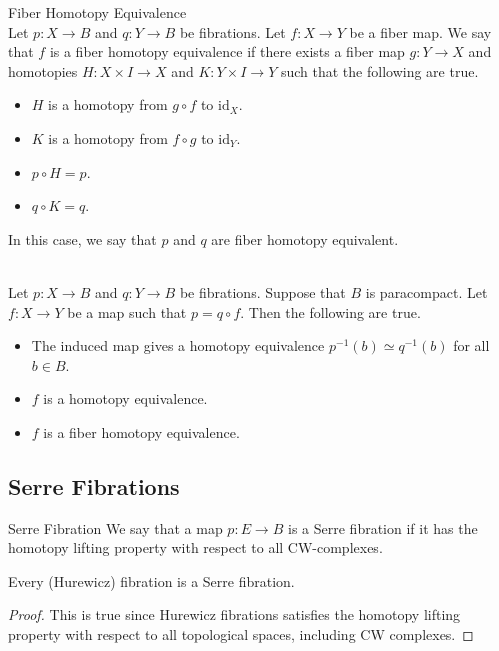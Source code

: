 \documentclass[a4paper]{article}
\begin{document}
\begin{defn}{Fiber Homotopy Equivalence}{}\\
Let $p:X\to B$ and $q:Y\to B$ be fibrations. Let $f:X\to Y$ be a fiber map. We say that $f$ is a fiber homotopy equivalence if there exists a fiber map $g:Y\to X$ and homotopies $H:X\times I\to X$ and $K:Y\times I\to Y$ such that the following are true. 
\begin{itemize}
\item $H$ is a homotopy from $g\circ f$ to $\text{id}_X$. 
\item $K$ is a homotopy from $f\circ g$ to $\text{id}_Y$. 
\item $p\circ H=p$. 
\item $q\circ K=q$. 
\end{itemize}
In this case, we say that $p$ and $q$ are fiber homotopy equivalent. 
\end{defn}

\begin{prp}{}{}\\
Let $p:X\to B$ and $q:Y\to B$ be fibrations. Suppose that $B$ is paracompact. Let $f:X\to Y$ be a map such that $p=q\circ f$. Then the following are true. 
\begin{itemize}
\item The induced map gives a homotopy equivalence $p^{-1}(b)\simeq q^{-1}(b)$ for all $b\in B$. 
\item $f$ is a homotopy equivalence. 
\item $f$ is a fiber homotopy equivalence. 
\end{itemize}
\end{prp}

\subsection{Serre Fibrations}
\begin{defn}{Serre Fibration}{} We say that a map $p:E\to B$ is a Serre fibration if it has the homotopy lifting property with respect to all CW-complexes. 
\end{defn}

\begin{lmm}{}{} Every (Hurewicz) fibration is a Serre fibration. 
\begin{proof}
This is true since Hurewicz fibrations satisfies the homotopy lifting property with respect to all topological spaces, including CW complexes. 
\end{proof}
\end{lmm}
\end{document}
